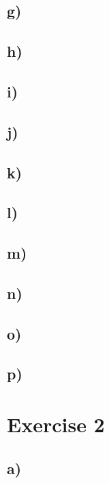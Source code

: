 \documentclass[12pt]{article}
\begin{document}
\subsection*{g)}
\label{sub:g)}

\subsection*{h)}
\label{sub:h)}

\subsection*{i)}
\label{sub:i)}

\subsection*{j)}
\label{sub:j)}

\subsection*{k)}
\label{sub:k)}

\subsection*{l)}
\label{sub:l)}

\subsection*{m)}
\label{sub:m)}

\subsection*{n)}
\label{sub:n)}

\subsection*{o)}
\label{sub:o)}

\subsection*{p)}
\label{sub:p)}

\section*{Exercise 2}

\subsection*{a)}
\label{sub:a)}
\end{document}

